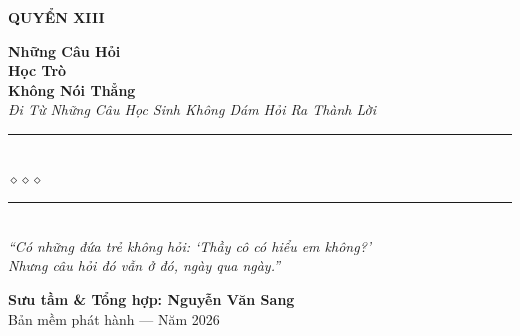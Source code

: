 \begin{titlepage}
\begin{center}
  \begin{tcolorbox}[
    width=6.5cm,
    colback=lamporange!20,
    colframe=lamporange!80!black,
    arc=4pt,
    boxrule=1.5pt,
    halign=center
  ]
    {\fontsize{18}{22}\selectfont\bfseries\color{nightblue!80!black}
     QUYỂN XIII}
  \end{tcolorbox}
  \vspace{0.8cm}

  {\fontsize{28}{34}\selectfont\bfseries\color{nightblue!80!black}
    Những Câu Hỏi}\\[0.4cm]
  {\fontsize{28}{34}\selectfont\bfseries\color{lamporange!80!black}
    Học Trò}\\[0.4cm]
  {\fontsize{28}{34}\selectfont\bfseries\color{nightblue!80!black}
    Không Nói Thẳng}\\[0.4cm]

  {\fontsize{16}{20}\selectfont\color{lamporange!90!black}\itshape
    Đi Từ Những Câu Học Sinh Không Dám Hỏi Ra Thành Lời}\\[1cm]

  {\color{deepbrown!60}\rule{6cm}{1pt}}\\[5pt]
  {\color{lamporange!80!black}\large$\diamond$\hspace{1cm}$\diamond$\hspace{1cm}$\diamond$}\\[5pt]
  {\color{deepbrown!60}\rule{6cm}{1pt}}\\[1.5cm]

  {\normalsize\itshape\color{deepbrown!90!black}
   ``Có những đứa trẻ không hỏi: `Thầy cô có hiểu em không?'\\
   Nhưng câu hỏi đó vẫn ở đó, ngày qua ngày.''}

  \vfill

  {\fontsize{16}{20}\selectfont\bfseries\color{deepbrown!90!black}
    Sưu tầm \& Tổng hợp: \textbf{Nguyễn Văn Sang}}\\[0.4cm]

  {\small\color{gray} Bản mềm phát hành --- Năm 2026}\\[0.5cm]
\end{center}

\afterpage{\nopagecolor}
\end{titlepage}